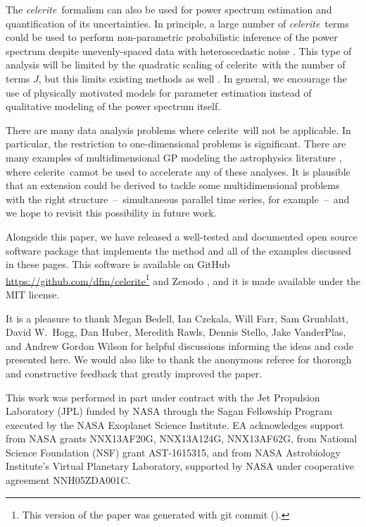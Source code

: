 \documentclass[manuscript, letterpaper]{aastex6}
\newcommand{\project}[1]{\textsf{#1}}
\newcommand{\celerite}{\project{celerite}}
\newcommand{\celeriteterm}{\emph{celerite}}
\newcommand{\response}[1]{{\color{blue}#1}}
\begin{document}
The \celeriteterm\ formalism can also be used for power spectrum estimation and
quantification of its uncertainties.
In principle, a large number of \celeriteterm\ terms could be used to perform
non-parametric probabilistic inference of the power spectrum despite
unevenly-spaced data with heteroscedastic noise \citep[for
example,][]{Wilson:2013, Kelly:2014}.
This type of analysis will be limited by the quadratic scaling of \celerite\
with the number of terms $J$, but this limits existing methods as well
\citep[CARMA models,][]{Kelly:2014}.
In general, we encourage the use of physically motivated models for parameter
estimation instead of qualitative modeling of the power spectrum itself.

There are many data analysis problems where \celerite\ will not be applicable.
In particular, the restriction to one-dimensional problems is significant.
There are many examples of multidimensional GP modeling the astrophysics
literature \citep[recent examples from the field of exoplanet characterization
include][]{Haywood:2014, Rajpaul:2015, Aigrain:2016}, where \celerite\ cannot
be used to accelerate any of these analyses.
It is plausible that an extension could be derived to tackle some
multidimensional problems with the right structure~--~simultaneous parallel
time series, for example~--~and we hope to revisit this possibility in future
work.

Alongside this paper, we have released a well-tested and documented open
source software package that implements the method and all of the examples
discussed in these pages.
This software is available on GitHub
\url{https://github.com/dfm/celerite}\footnote{This version of the paper was
generated with git commit \texttt{\githash} (\gitdate).} and Zenodo
\citep{Foreman-Mackey:2017}, and it is made available under the MIT license.

\acknowledgments
It is a pleasure to thank
Megan Bedell,
Ian Czekala,
Will Farr,
Sam Grunblatt,
David W.\ Hogg,
Dan Huber,
Meredith Rawls,
Dennis Stello,
Jake VanderPlas, and
Andrew Gordon Wilson
for helpful discussions informing the ideas and code presented here.
\response{We would also like to thank the anonymous referee for thorough and
constructive feedback that greatly improved the paper.}

This work was performed in part under contract with the Jet Propulsion
Laboratory (JPL) funded by NASA through the Sagan Fellowship Program executed
by the NASA Exoplanet Science Institute.
EA acknowledges support from NASA grants NNX13AF20G, NNX13A124G, NNX13AF62G,
from National Science Foundation (NSF) grant AST-1615315, and from
NASA Astrobiology Institute's Virtual Planetary Laboratory, supported
by NASA under cooperative agreement NNH05ZDA001C.
\end{document}
